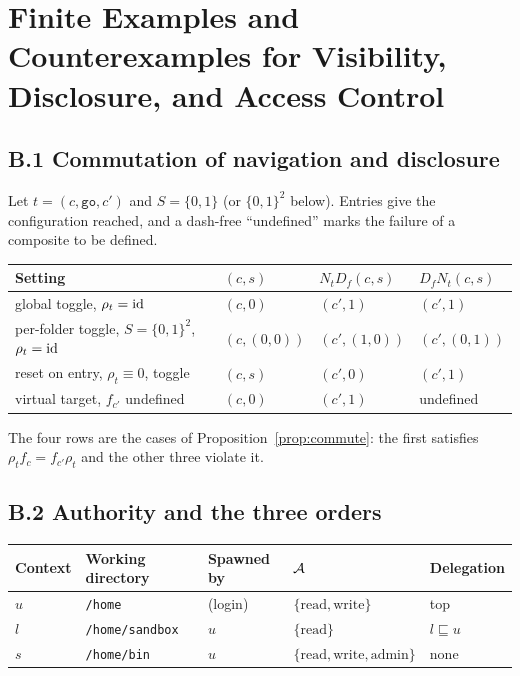\section{Finite Examples and Counterexamples for Visibility, Disclosure, and Access Control}

\subsection*{B.1 Commutation of navigation and disclosure}

Let $t=(c,\texttt{go},c')$ and $S=\{0,1\}$ (or $\{0,1\}^2$ below). Entries give the configuration reached, and a dash-free ``undefined'' marks the failure of a composite to be defined.

\begin{center}
\begin{tabular}{llll}
\toprule
Setting & $(c,s)$ & $N_tD_f(c,s)$ & $D_fN_t(c,s)$\\
\midrule
global toggle, $\rho_t=\mathrm{id}$ & $(c,0)$ & $(c',1)$ & $(c',1)$\\
per-folder toggle, $S=\{0,1\}^2$, $\rho_t=\mathrm{id}$ & $(c,(0,0))$ & $(c',(1,0))$ & $(c',(0,1))$\\
reset on entry, $\rho_t\equiv0$, toggle & $(c,s)$ & $(c',0)$ & $(c',1)$\\
virtual target, $f_{c'}$ undefined & $(c,0)$ & $(c',1)$ & undefined\\
\bottomrule
\end{tabular}
\end{center}

The four rows are the cases of Proposition~\ref{prop:commute}: the first satisfies $\rho_tf_c=f_{c'}\rho_t$ and the other three violate it.

\subsection*{B.2 Authority and the three orders}

\begin{center}
\begin{tabular}{lllll}
\toprule
Context & Working directory & Spawned by & $\mathcal A$ & Delegation\\
\midrule
$u$ & \texttt{/home} & (login) & $\{\mathrm{read},\mathrm{write}\}$ & top\\
$l$ & \texttt{/home/sandbox} & $u$ & $\{\mathrm{read}\}$ & $l\sqsubseteq u$\\
$s$ & \texttt{/home/bin} & $u$ & $\{\mathrm{read},\mathrm{write},\mathrm{admin}\}$ & none\\
\bottomrule
\end{tabular}
\end{center}

